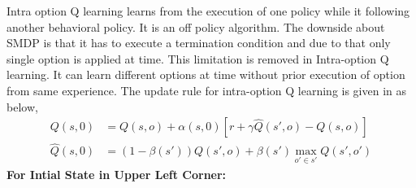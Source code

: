 \documentclass[preprint,12pt]{elsarticle}
\begin{document}
Intra option Q learning learns from the execution of one policy while it following another behavioral policy. It is an off policy algorithm. The downside about SMDP is that it has to execute a termination condition and due to that only single option is applied at time. This limitation is removed in Intra-option Q learning. It can learn different options at time without prior execution of option from same experience. The update rule for intra-option Q learning is given in as below,
\begin{equation}
\begin{aligned}
Q(s,0) &= Q(s,o) + \alpha(s,0) [r+\gamma \hat{Q}(s',o) - Q(s,o)] \\
\hat{Q}(s,0) &= (1-\beta(s')) Q(s',o) + \beta(s')  \max_{o'\in s'} Q(s',o')
\end{aligned}
\end{equation}
\textbf{For Intial State in Upper Left Corner:} 
\end{document}
